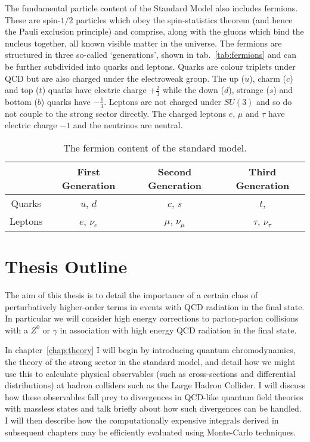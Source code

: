 	The fundamental particle content of the Standard Model also includes fermions. These are spin-$1/2$
	particles which obey the spin-statistics theorem (and hence the Pauli exclusion principle) and
	comprise, along with the gluons which bind the nucleus together, all known visible matter in the
	universe. The fermions are structured in three so-called `generations', shown in tab.~\eqref{tab:fermions}
	and can be further subdivided into quarks and leptons. Quarks are colour triplets under QCD but are
	also charged under the electroweak group.  The up ($u$), charm ($c$) and top ($t$) quarks have electric
	charge $+\frac{2}{3}$ while the down ($d$), strange ($s$) and bottom ($b$) quarks have $-\frac{1}{3}$.
	Leptons are not charged under $SU(3)$ and so do not couple to the strong sector directly.  The charged leptons
	$e$, $\mu$ and $\tau$ have electric charge $-1$ and the neutrinos are neutral.

	\begin{table}[hbt!]
	\begin{center}
	\begin{tabular}{c | c | c | c}
	        & First Generation & Second Generation & Third Generation   \\ \hline
	Quarks  &  $u$, $d$        & $c$, $s$          & $t$,               \\ \hline
	Leptons &  $e$, $\nu_e$    & $\mu$, $\nu_\mu$  & $\tau$, $\nu_\tau$ \\
	\end{tabular}
	\caption{The fermion content of the standard model.}
	\label{tab:fermions}
	\end{center}
	\end{table}

\vspace{-1.0cm}
\section{Thesis Outline}
	\label{sec:outline}

	The aim of this thesis is to detail the importance of a certain class of perturbatively higher-order terms
	in events with QCD radiation in the final state.  In particular we will consider high energy corrections to parton-parton
	collisions with a $Z^0$ or $\gamma$ in association with high energy QCD radiation in the final state.

	In chapter~\ref{chap:theory} I will begin by introducing quantum chromodynamics, the theory of the strong
	sector in the standard model, and detail how we might use this to calculate physical observables (such as
	cross-sections and differential distributions) at hadron colliders such as the Large Hadron Collider.  I
	will discuss how these observables fall prey to divergences in QCD-like quantum field theories with massless
	states and talk briefly about how such divergences can be handled.  I will then describe how the computationally
	expensive integrals derived in subsequent chapters may be efficiently evaluated using Monte-Carlo techniques.

